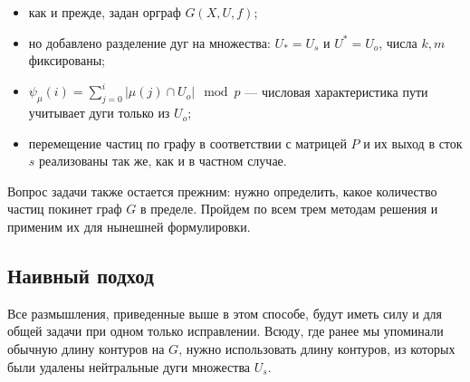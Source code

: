 	\begin{itemize}
		\item как и прежде, задан орграф $G(X,U,f)$;
		\item но добавлено разделение дуг на множества: $U_* = U_s$ и $U^* = U_o$, числа $k, m$ фиксированы;
		\item $\psi_\mu(i) = \sum_{j=0}^i | \mu(j) \cap U_o | \mod p$ --- числовая характеристика пути учитывает дуги только из $U_o$; 
		\item перемещение частиц по графу в соответствии с матрицей $P$ и их выход в сток $s$ реализованы так же, как и в частном случае.
	\end{itemize}

	Вопрос задачи также остается прежним: нужно определить, какое количество частиц покинет граф $G$ в пределе. Пройдем по всем трем методам решения и применим их для нынешней формулировки. 
	
	\subsection{Наивный подход}
	
	Все размышления, приведенные выше в этом способе, будут иметь силу и для общей задачи при одном только исправлении. Всюду, где ранее мы упоминали обычную длину контуров на $G$, нужно использовать длину контуров, из которых были удалены нейтральные дуги множества $U_s$. 
	
	
	\newpage %
	
	\printbibliography[
	heading=bibintoc%
	,title=Библиография %
	]
	


